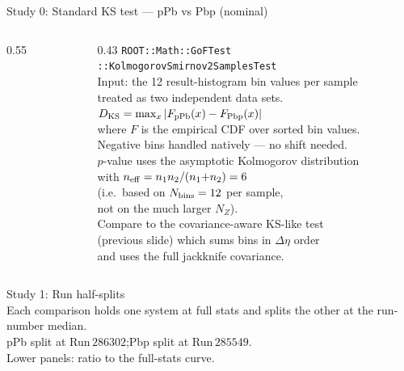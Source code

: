 \documentclass[aspectratio=169]{beamer}
\newcommand{\sectionframe}[2]{%
  \begin{frame}[c]
    \centering\Large #1\\\normalsize\vspace{0.6em}#2
  \end{frame}
}
\newcommand{\bno}{../output_12x12_nominal}
\begin{document}
\begin{frame}[t]{Study 0: Standard KS test --- pPb vs Pbp (nominal)}
  \small
  \begin{columns}[T]
    \begin{column}{0.55\textwidth}
      \resizebox{\linewidth}{!}{}
    \end{column}
    \begin{column}{0.43\textwidth}
      \footnotesize
      \texttt{ROOT::Math::GoFTest}\\
      \texttt{::KolmogorovSmirnov2SamplesTest}\\[0.3em]
      Input: the 12 result-histogram bin values per sample\\
      treated as two independent data sets.\\[0.2em]
      $D_{\rm KS} = \max_x |F_{\rm pPb}(x) - F_{\rm Pbp}(x)|$\\[0.1em]
      where $F$ is the empirical CDF over sorted bin values.\\
      Negative bins handled natively — no shift needed.\\[0.2em]
      $p$-value uses the asymptotic Kolmogorov distribution\\
      with $n_{\rm eff} = n_1 n_2/(n_1{+}n_2) = 6$\\
      (i.e.\ based on $N_{\rm bins}=12$ per sample,\\
      not on the much larger $N_Z$).\\[0.2em]
      Compare to the covariance-aware KS-like test\\
      (previous slide) which sums bins in $\Delta\eta$ order\\
      and uses the full jackknife covariance.
    \end{column}
  \end{columns}
\end{frame}

\begin{frame}[c]\label{sec:no_end}\end{frame}

\sectionframe{Study 1: Run half-splits}{%
  Each comparison holds one system at full stats and splits the other at the run-number median.\\[0.3em]
  pPb split at Run\,$286302$;\quad Pbp split at Run\,$285549$.\\[0.3em]
  Lower panels: ratio to the full-stats curve.}
\end{document}
